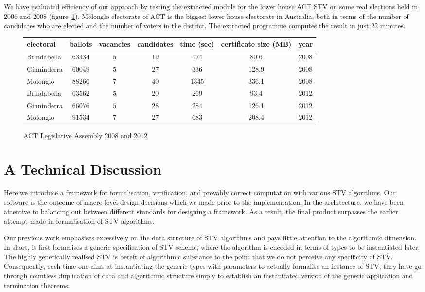 \documentclass{llncs}
\begin{document}
 
 We have evaluated efficiency of our approach by testing the extracted module for the lower house ACT STV on some real elections held in 2006 and 2008 (figure~\ref{ref;figure6}). Molonglo electorate of ACT is the biggest lower house electorate in Australia, both in terms of the number of candidates who are elected and the number of voters in the district. The extracted programme computes the result in just 22 minutes.  
 \begin{small}
\begin{figure}[b]
\centering
\begin{tabular}{|l |c |c |c |c |c|c|}
\hline
electoral & ballots& vacancies& candidates& time (sec)& certificate size (MB)&year\\
\hline
Brindabella &$63334$&$5$&$19$&$124$&80.6&2008\\
Ginninderra &$60049$&$5$&$27$&$336$&128.9&2008\\
Molonglo &$88266$&$7$&$40$&$1345$&336.1&2008\\
Brindabella&$63562$&$5$&$20$&$269$&93.4&2012\\
Ginninderra&$66076$&$5$&$28$&$284$&126.1&2012\\
Molonglo&$91534$&$7$&$27$&$683$&208.4&2012\\
\hline
\end{tabular}
\caption{ACT Legislative Assembly 2008 and 2012}
\label{ref;figure6}
\end{figure}
\end{small}  
\section{A Technical Discussion}
Here we introduce a framework for formalisation, verification, and provably correct computation with various STV algorithms. Our software is the outcome of macro level design decisions which we made prior to the implementation. In the architecture, we have been attentive to  balancing out between different standards for designing a framework. As a result, the final product surpasses the earlier attempt  made in formalisation of STV algorithms\cite{}.

Our previous work emphasises excessively on the data structure of STV algorithms and pays little attention to the algorithmic dimension. In short, it first formalises a  generic  specification of STV scheme, where the algorithm is encoded in terms of types to be instantiated later. The highly generically realised STV is bereft of algorithmic substance to the point that we do not perceive any specificity of STV. Consequently, each time one aims at instantiating the generic types with parameters to actually formalise an instance of STV, they have go through countless  duplication of data and algorithmic structure simply to  establish an instantiated version of the generic application and termination theorems. 
\end{document}

